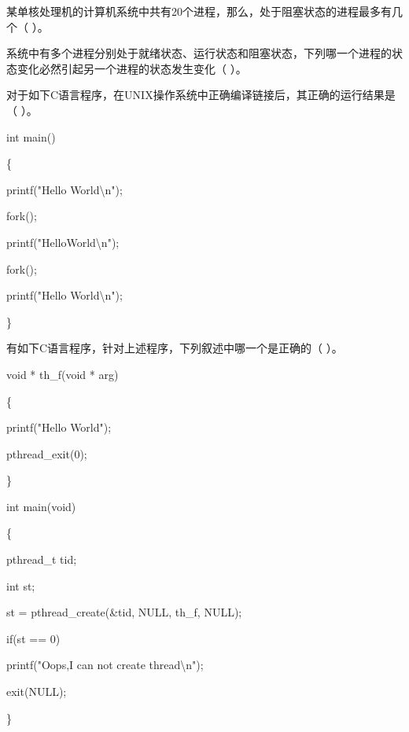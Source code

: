 \begin{qitems}[startnum=1]
\begin{bbox}
\qitem 某单核处理机的计算机系统中共有20个进程，那么，处于阻塞状态的进程最多有几个（ ）。\par
{}
\end{bbox}

\begin{bbox}
\qitem 系统中有多个进程分别处于就绪状态、运行状态和阻塞状态，下列哪一个进程的状态变化必然引起另一个进程的状态发生变化（ ）。\par
{}
\end{bbox}

\begin{bbox}
\qitem 对于如下C语言程序，在UNIX操作系统中正确编译链接后，其正确的运行结果是（ ）。\par
{\ttfamily\small
int main()\par
\{\par
\quad printf("Hello World\textbackslash n");\par
\quad fork();\par
\quad printf("HelloWorld\textbackslash n");\par
\quad fork();\par
\quad printf("Hello World\textbackslash n");\par
\}\par
}
\end{bbox}

\begin{bbox}
\qitem 有如下C语言程序，针对上述程序，下列叙述中哪一个是正确的（ ）。\par
{\ttfamily\small
void * th\_f(void * arg)\par
\{\par
\quad printf("Hello World");\par
\quad pthread\_exit(0);\par
\}\par
int main(void)\par
\{\par
\quad pthread\_t tid;\par
\quad int st;\par
\quad st = pthread\_create(\&tid, NULL, th\_f, NULL);\par
\quad if(st == 0)\par
\qquad printf("Oops,I can not create thread\textbackslash n");\par
\quad exit(NULL);\par
\}\par
}
\end{bbox}


\end{qitems}
